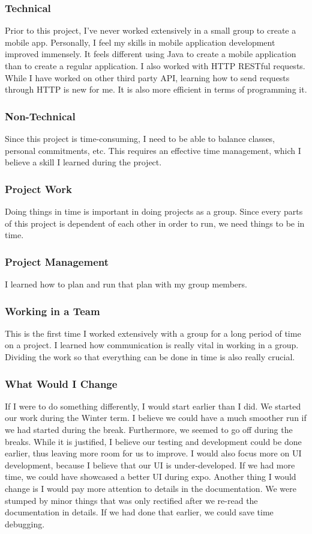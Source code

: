 \documentclass[journal,compsoc, 10pt, draftclsnofoot, onecolumn]{IEEEtran}
\begin{document}
\subsubsection{Technical}
Prior to this project, I've never worked extensively in a small group to create 
a mobile app. Personally, I feel my skills in mobile application development 
improved immensely. It feels different using Java to create a mobile 
application than to create a regular application. I also worked with HTTP 
RESTful requests. While I have worked on other third party API, learning how 
to send requests through HTTP is new for me. It is also more efficient in terms 
of programming it.

\subsubsection{Non-Technical}
Since this project is time-consuming, I need to be able to balance classes, 
personal commitments, etc. This requires an effective time management, 
which I believe a skill I learned during the project. 

\subsubsection{Project Work}
Doing things in time is important in doing projects as a group. Since every 
parts of this project is dependent of each other in order to run, we need 
things to be in time. 

\subsubsection{Project Management}
I learned how to plan and run that plan with my group members. 

\subsubsection{Working in a Team}
This is the first time I worked extensively with a group for a long period of 
time on a project. I learned how communication is really vital in working in a 
group. Dividing the work so that everything can be done in time is also really 
crucial.

\subsubsection{What Would I Change}
If I were to do something differently, I would start earlier than I did. We 
started our work during the Winter term. I believe we could have a much smoother 
run if we had started during the break. Furthermore, we seemed to go off during 
the breaks. While it is justified, I believe our testing and development could be 
done earlier, thus leaving more room for us to improve. I would also focus more 
on UI development, because I believe that our UI is under-developed. If we 
had more time, we could have showcased a better UI during expo.  Another thing 
I would change is I would pay more attention to details in the documentation. We 
were stumped by minor things that was only rectified after we re-read the 
documentation in details. If we had done that earlier, we could save time 
debugging.
\end{document}
